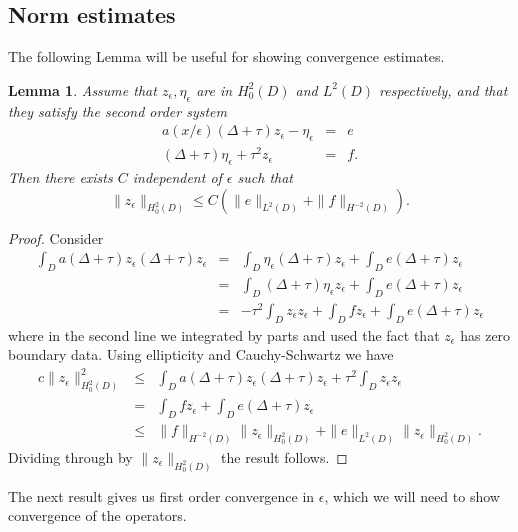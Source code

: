 \documentclass[10pt,a4paper]{amsart}
\newtheorem{lemma}{Lemma}
\begin{document}
\subsection{Norm estimates}
The following Lemma will be useful for showing convergence estimates.
\begin{lemma} \label{systemlem} Assume that $z_\epsilon, \eta_\epsilon$ are in $H^2_0( D)$ and $L^2( D)$ respectively, and that they satisfy the second order system 
\begin{eqnarray}\label{eq:zepssystem}  a(x/\epsilon) (\Delta +\tau )z_\epsilon - \eta_\epsilon  &= & e \\ (\Delta +\tau )\eta_\epsilon  +\tau^2 z_\epsilon &=& f. \nonumber\end{eqnarray}
Then there exists $C$ independent of $\epsilon$ such that 
\begin{equation} \| z_\epsilon\|_{H^2_0( D)} \leq C (\| e \|_{L^2( D)} + \| f\|_{H^{-2}( D)}). \end{equation} 
\end{lemma}
\begin{proof}
Consider \begin{eqnarray} \int_ D a(\Delta + \tau)z_\epsilon (\Delta +\tau)z_\epsilon &=& \int_ D \eta_\epsilon (\Delta +\tau)z_\epsilon + \int_ D e(\Delta+\tau)z_\epsilon \nonumber \\ &=& \int_ D  (\Delta +\tau)\eta_\epsilon z_\epsilon + \int_ D e(\Delta+\tau)z_\epsilon \nonumber \\ 
&=&-\tau^2 \int_ D z_\epsilon z_\epsilon +\int_ D f z_\epsilon + \int_ D e(\Delta+\tau)z_\epsilon \nonumber \end{eqnarray}
where in the second line we integrated by parts and used the fact that $z_\epsilon$ has zero boundary data. Using ellipticity and Cauchy-Schwartz we have
 \begin{eqnarray} c\| z_\epsilon\|^2_{H^2_0( D)} &\leq& \int_ D a(\Delta + \tau)z_\epsilon (\Delta +\tau)z_\epsilon +\tau^2 \int_ D z_\epsilon z_\epsilon \nonumber \\ &= &\int_ D f z_\epsilon + \int_ D e(\Delta+\tau)z_\epsilon \nonumber \\ &\leq& \| f\|_{H^{-2}( D)} \| z_\epsilon\|_{H^2_0( D)} + \| e \|_{L^2( D)}   \| z_\epsilon\|_{H^2_0( D)} .\end{eqnarray}
Dividing through by $\| z_\epsilon\|_{H^2_0( D)}$ the result follows.
\end{proof}
\noindent
The next result gives us first order convergence in $\epsilon$, which we will need to show convergence of the operators. 
\end{document}
